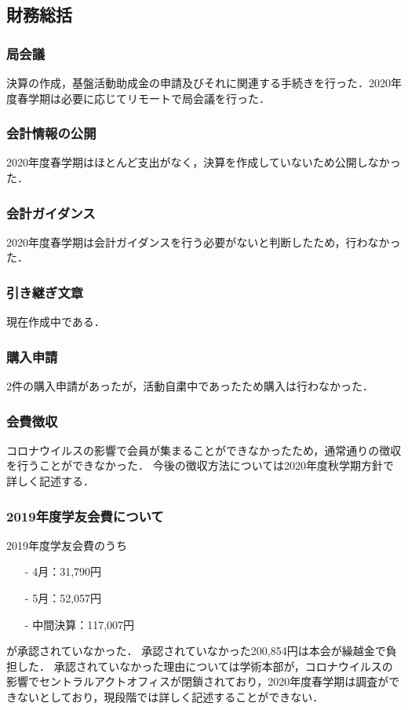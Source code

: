 \subsection*{財務総括}


\subsubsection*{局会議}
決算の作成，基盤活動助成金の申請及びそれに関連する手続きを行った．2020年度春学期は必要に応じてリモートで局会議を行った．

\subsubsection*{会計情報の公開}
2020年度春学期はほとんど支出がなく，決算を作成していないため公開しなかった．

\subsubsection*{会計ガイダンス}
2020年度春学期は会計ガイダンスを行う必要がないと判断したため，行わなかった．

\subsubsection*{引き継ぎ文章}
現在作成中である．

\subsubsection*{購入申請}
2件の購入申請があったが，活動自粛中であったため購入は行わなかった．

\subsubsection*{会費徴収}
コロナウイルスの影響で会員が集まることができなかったため，通常通りの徴収を行うことができなかった．
今後の徴収方法については2020年度秋学期方針で詳しく記述する．

\subsubsection*{2019年度学友会費について}
2019年度学友会費のうち
\begin{itemize}
	\item[-]4月：31,790円
	\item[-]5月：52,057円
	\item[-]中間決算：117,007円
\end{itemize}
が承認されていなかった．
承認されていなかった200,854円は本会が繰越金で負担した．
承認されていなかった理由については学術本部が，コロナウイルスの影響でセントラルアクトオフィスが閉鎖されており，2020年度春学期は調査ができないとしており，現段階では詳しく記述することができない．


